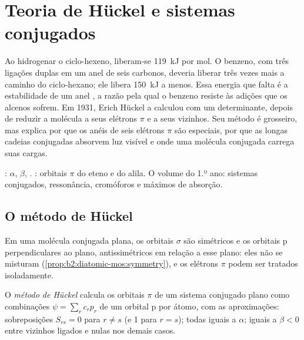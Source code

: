 \chapter{Teoria de Hückel e sistemas conjugados}\label{ch:b2:huckel}

Ao hidrogenar o ciclo-hexeno, liberam-se \qty{119}{kJ} por mol. O benzeno, com
três ligações duplas em um anel de seis carbonos, deveria liberar três vezes
mais a caminho do ciclo-hexano; ele libera \qty{150}{kJ} a menos. Essa energia
que falta é a estabilidade de um anel , a razão pela qual o benzeno
resiste às adições que os alcenos sofrem. Em 1931, Erich Hückel a calculou com
um determinante, depois de reduzir a molécula a seus elétrons $\pi$ e a seus
vizinhos. Seu método é grosseiro, mas explica por que os anéis de seis
elétrons $\pi$ são especiais, por que as longas cadeias conjugadas absorvem luz
visível e onde uma molécula conjugada carrega suas cargas.

\begin{recall}
:  $\alpha$, 
$\beta$, . : orbitais $\pi$ do
eteno e do alila. O volume do 1.º ano: sistemas conjugados, ressonância,
cromóforos e máximos de absorção.
\end{recall}

\section{O método de Hückel}

Em uma molécula conjugada plana, os orbitais $\sigma$ são simétricos e os
orbitais p perpendiculares ao plano, antissimétricos em relação a esse plano:
eles não se misturam (\cref{prop:b2:diatomic-mos:symmetry}), e os elétrons $\pi$
podem ser tratados isoladamente.

\begin{definition}\label{def:b2:huckel:method}
O \emph{método de Hückel} calcula os orbitais $\pi$ de um
sistema conjugado plano como combinações $\psi = \sum_r c_r p_r$ de um orbital p
por átomo, com as aproximações: sobreposições $S_{rs} = 0$ para $r \neq s$ (e 1 para $r =
s$);  todas iguais a $\alpha$;  iguais a $\beta < 0$ entre vizinhos ligados e nulas nos demais casos.
\end{definition}

